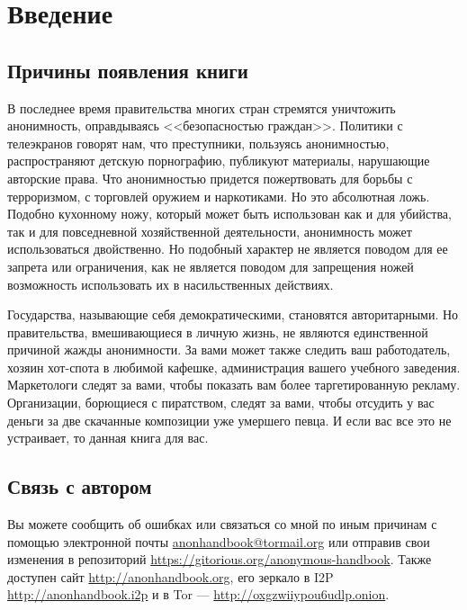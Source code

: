 \chapter{Введение}
\section{Причины появления книги}
В последнее время правительства многих стран стремятся уничтожить анонимность, оправдываясь <<безопасностью граждан>>. Политики с телеэкранов говорят нам, что преступники, пользуясь анонимностью, распространяют детскую порнографию, публикуют материалы, нарушающие авторские права. Что анонимностью придется пожертвовать для борьбы с терроризмом, с торговлей оружием и наркотиками. Но это абсолютная ложь. Подобно кухонному ножу, который может быть использован как и для убийства, так и для повседневной хозяйственной деятельности, анонимность может использоваться двойственно. Но подобный характер не является поводом для ее запрета или ограничения, как не является поводом для запрещения ножей возможность использовать их в насильственных действиях.

Государства, называющие себя демократическими, становятся авторитарными. Но правительства, вмешивающиеся в личную жизнь, не являются единственной причиной жажды анонимности. За вами может также следить ваш работодатель, хозяин хот-спота в любимой кафешке, администрация вашего учебного заведения. Маркетологи следят за вами, чтобы показать вам более таргетированную рекламу. Организации, борющиеся с пиратством, следят за вами, чтобы отсудить у вас деньги за две скачанные композиции уже умершего певца. И если вас все это не устраивает, то данная книга для вас.

\section{Связь с автором}
Вы можете сообщить об ошибках или связаться со мной по иным причинам с помощью электронной почты \href{mailto:anonhandbook@tormail.org}{anonhandbook@tormail.org} или отправив свои изменения в репозиторий \url{https://gitorious.org/anonymous-handbook}. Также доступен сайт \url{http://anonhandbook.org}, его зеркало в I2P \url{http://anonhandbook.i2p} и в Tor --- \url{http://oxgzwiiypou6udlp.onion}.
